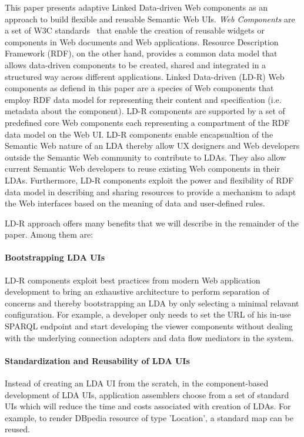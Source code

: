 \documentclass{acm_proc_article-sp}
\begin{document}
This paper presents adaptive Linked Data-driven Web components as an approach to build flexible and reusable Semantic Web UIs.
\emph{Web Components} are a set of W3C standards~\cite{webcomponentsW3C} that enable the creation of reusable widgets or components in Web documents and Web applications.
Resource Description Framework (RDF), on the other hand, provides a common data model that allows data-driven components to be created, shared and integrated in a structured way across different applications.
Linked Data-driven (LD-R) Web components as defiend in this paper are a species of Web components that employ RDF data model for representing their content and specification (i.e. metadata about the component).
LD-R components are supported by a set of predefined core Web components each representing a compartment of the RDF data model on the Web UI.
LD-R components enable encapsualtion of the Semantic Web nature of an LDA thereby allow UX designers and Web developers outside the Semantic Web community to contribute to LDAs.
They also allow current Semantic Web developers to reuse existing Web components in their LDAs.
Furthermore, LD-R components exploit the power and flexibility of RDF data model in describing and sharing resources to provide a mechanism to adapt the Web interfaces based on the meaning of data and user-defined rules. 

LD-R approach offers many benefits that we will describe in the remainder of the paper. Among them are:

\paragraph{Bootstrapping LDA UIs} 
LD-R components exploit best practices from modern Web application development to bring an exhaustive architecture to perform separation of concerns and thereby bootstrapping an LDA by only selecting a minimal relavant configuration.
For example, a developer only needs to set the URL of his in-use SPARQL endpoint and start developing the viewer components without dealing with the underlying connection adapters and data flow mediators in the system.

\paragraph{Standardization and Reusability of LDA UIs} 
Instead of creating an LDA UI from the scratch, in the component-based development of LDA UIs, application assemblers choose from a set of standard UIs which will reduce the time and costs associated with creation of LDAs.
For example, to render DBpedia resource of type 'Location', a standard map can be reused.
\end{document}
